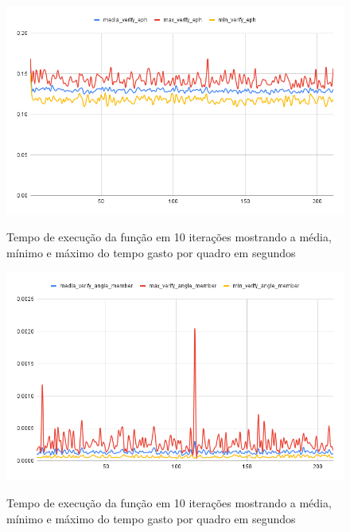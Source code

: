 \begin{figure}[H]
	\centering
	\caption{Tempo de execução da função  em 10 iterações mostrando a média, mínimo e máximo do tempo gasto por quadro em segundos}
	\includegraphics[scale=0.5]{figuras/grafico/eph.png}
	\label{graf:G3}
\end{figure}


\begin{figure}[H]
	\centering
	\caption{Tempo de execução da função  em 10 iterações mostrando a média, mínimo e máximo do tempo gasto por quadro em segundos}
	\includegraphics[scale=0.6]{figuras/grafico/angulo.png}
	\label{graf:G4}
\end{figure}


